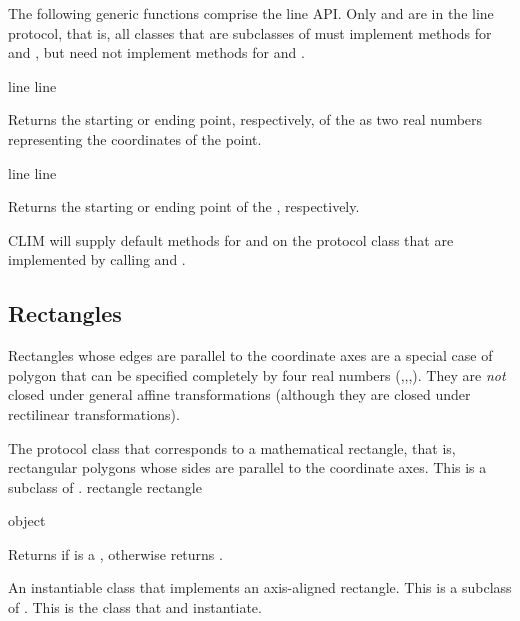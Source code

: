 The following generic functions comprise the line API.  Only
 and  are in the line protocol, that
is, all classes that are subclasses of  must implement methods for
 and , but need not implement methods
for  and .

 {line}
   {line}

Returns the starting or ending point, respectively, of the 
 as two real numbers representing the coordinates of the point.

 {line}
   {line}

Returns the starting or ending point of the  ,
respectively.

CLIM will supply default methods for  and
 on the protocol class  that are implemented by
calling  and .


\subsection {Rectangles} 
\label {rect}

Rectangles whose edges are parallel to the coordinate axes are a special case of
polygon that can be specified completely by four real numbers
(,,,).  They are {\sl not} closed under general
affine transformations (although they are closed under rectilinear
transformations).


The protocol class that corresponds to a mathematical rectangle, that is,
rectangular polygons whose sides are parallel to the coordinate axes.  This is a
subclass of .
 {rectangle} {rectangle}

 {object}

Returns  if  is a , otherwise returns
.


An instantiable class that implements an axis-aligned rectangle.  This is a
subclass of .  This is the class that  and
 instantiate.
\Immutable

